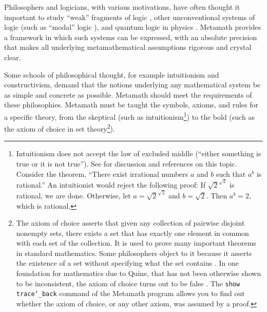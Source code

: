 Philosophers and logicians, with various motivations, have often thought it
important to study ``weak'' fragments of logic
\cite{Anderson} \cite{MegillBunder}, other unconventional systems of logic (such as
``modal'' logic \cite[ch.\ 27]{Boolos}), and quantum logic in physics
\cite{Pavicic}.  Metamath
provides a framework in which such systems can be expressed, with an absolute
precision that makes all underlying metamathematical assumptions rigorous and
crystal clear.

Some schools of philosophical thought, for example
intuitionism and constructivism,
demand that the notions underlying any mathematical system be as simple and
concrete as possible.  Metamath should meet the requirements of these
philosophies.  Metamath must be taught the symbols, axioms, and
rules for a specific theory, from the skeptical (such as
intuitionism\footnote{Intuitionism does not accept the law
of excluded middle (``either something is true or it is not true'').  See
\cite[p.~xi]{Tymoczko} for discussion and references
on this topic.  Consider the theorem, ``There exist irrational numbers $a$ and
$b$ such that $a^b$ is rational.''  An intuitionist would reject the following
proof:  If $\sqrt{2}^{\sqrt{2}}$ is rational, we are done.  Otherwise, let
$a=\sqrt{2}^{\sqrt{2}}$ and $b=\sqrt{2}$. Then $a^b=2$, which is rational.})
to the bold (such as the axiom of choice in set theory\footnote{The axiom of
choice asserts that given any collection of pairwise
disjoint nonempty sets, there exists a set that has exactly one element in
common with each set of the collection.  It is used to prove many important
theorems in standard mathematics.  Some philosophers object to it because it
asserts the existence of a set without specifying what the set contains
\cite[p.~154]{Enderton}.  In one foundation for
mathematics due to Quine, that has not been
otherwise shown to be inconsistent, the axiom of choice turns out to be false
\cite[p.~23]{Curry}.  The \texttt{show
trace{\char`\_}back} command of the Metamath program allows you to find out
whether the axiom of choice, or any other axiom, was assumed by a
proof.}).

